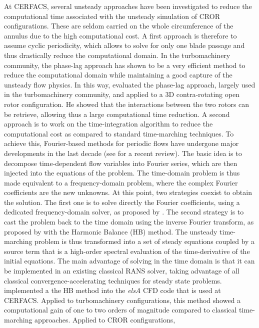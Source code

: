 At CERFACS, several unsteady approaches have been investigated 
to reduce the computational time associated with the unsteady simulation of 
CROR configurations. 
These are seldom carried on the whole
circumference of the annulus due to the high computational
cost. A first approach is therefore to assume cyclic periodicity,
which allows to solve for only one blade passage and thus drastically
reduce the computational domain. 
In the turbomachinery community, the phase-lag approach has shown to be
a very efficient method to reduce the computational domain while
maintaining a good capture of the unsteady flow physics. 
In this way, \citet{Burnazzi2010} evaluated the phase-lag approach, largely
used in the turbomachinery community, and
applied to a 3D contra-rotating open rotor configuration. He showed
that the interactions between the two rotors can be retrieve, allowing
thus a large computational time reduction.
A second approach 
is to work on the time-integration algorithm to reduce
the computational cost as compared to standard time-marching techniques. To achieve
this, Fourier-based methods for periodic flows have undergone major
developments in the last decade (see \citet{He2010} for a recent
review).  The basic idea is to decompose
time-dependent flow variables into Fourier series, which are then
injected into the equations of the problem. The time-domain problem is
thus made equivalent to a frequency-domain problem, where the complex
Fourier coefficients are the new unknowns. At this point, two
strategies coexist to obtain the solution. The first one is to solve
directly the Fourier coefficients, using a dedicated
frequency-domain solver, as proposed by \citet{He1998}. The second strategy is to cast the
problem back to the time domain using the inverse Fourier transform, as
proposed by \citet{Hall2002} with the Harmonic
Balance (HB) method. The unsteady time-marching problem is thus
transformed into a set of steady equations coupled by a source term
that is a high-order spectral evaluation of the time-derivative of the
initial equations. The main advantage of solving in the time domain is
that it can be implemented in an existing classical RANS solver,
taking advantage of all classical convergence-accelerating techniques
for steady state problems.
\citet{ThesisSicot} implemented a 
the HB method into the \emph{elsA} CFD code 
that is used at CERFACS. Applied to turbomachinery
configurations, this method showed a computational gain
of one to two orders of magnitude 
compared to classical time-marching approaches.
Applied to CROR configurations, \citet{Yabili2010}
